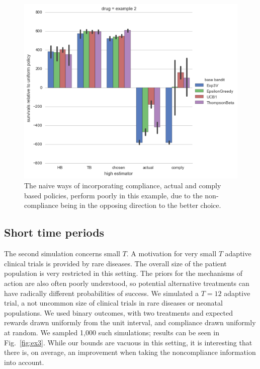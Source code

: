 \begin{figure}
	\label{fig:ex2}
	\centering	
	\includegraphics[width=1\columnwidth]{bandit/figs/ex2.png}\hspace{1cm}
		\caption{The naive ways of incorporating compliance, actual and comply based policies, perform poorly in this example, due to the non-compliance being in the opposing direction to the better choice.}
\end{figure}

	
%



\subsection{Short time periods}

The second simulation concerns small $T$. A motivation for very small $T$ adaptive clinical trials is provided by rare diseases. The overall size of the patient population is very restricted in this setting.
The priors for the mechanisms of action are also often poorly understood, so potential alternative treatments can have radically different probabilities of success. 
We simulated a $T=12$ adaptive trial, a not uncommon size of clinical trials in rare diseases or neonatal populations. We used binary outcomes, with two treatments and expected rewards drawn uniformly from the unit interval, and compliance drawn uniformly at random. We sampled 1,000 such simulations; results can be seen in Fig.~\eqref{fig:ex3}.
While our bounds are vacuous in this setting, it is interesting that there is, on average, an improvement when taking the noncompliance information into account.


